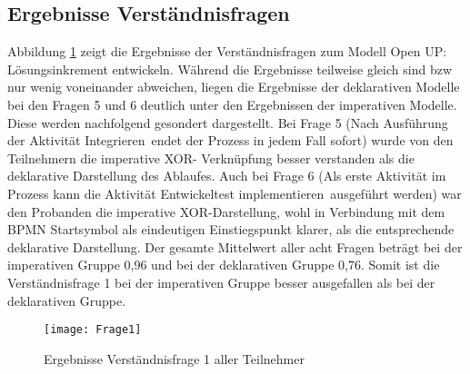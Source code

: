 \subsection{Ergebnisse Verständnisfragen}

Abbildung \ref{fig:Frage1} zeigt die Ergebnisse der Verständnisfragen zum Modell \grqq Open UP: Lösungsinkrement entwickeln\grqq. Während die Ergebnisse teilweise gleich sind bzw nur wenig voneinander abweichen, liegen die Ergebnisse der deklarativen Modelle bei den Fragen 5 und 6 deutlich unter den Ergebnissen der imperativen Modelle. Diese werden nachfolgend gesondert dargestellt. \newline
Bei Frage 5 (\grqq Nach Ausführung der Aktivität \grqq Integrieren\grqq \ endet der Prozess in jedem Fall sofort\grqq) wurde von den Teilnehmern die imperative XOR- Verknüpfung besser verstanden als die deklarative Darstellung des Ablaufes. Auch bei Frage 6 (\grqq Als erste Aktivität im Prozess kann die Aktivität \grqq Entwickeltest implementieren\grqq \ ausgeführt werden\grqq) war den Probanden die imperative XOR-Darstellung, wohl in Verbindung mit dem BPMN Startsymbol als eindeutigen Einstiegspunkt klarer, als die entsprechende deklarative Darstellung.\newline
Der gesamte Mittelwert aller acht Fragen beträgt bei der imperativen Gruppe 0,96 und bei der deklarativen Gruppe 0,76. Somit ist die Verständnisfrage 1 bei der imperativen Gruppe besser ausgefallen als bei der deklarativen Gruppe. \newline

\begin{figure}[htp]
\begin{center}
  \texttt{[image: Frage1]} %
  \caption{Ergebnisse Verständnisfrage 1 aller Teilnehmer}
  \label{fig:Frage1}
\end{center}
\end{figure}


